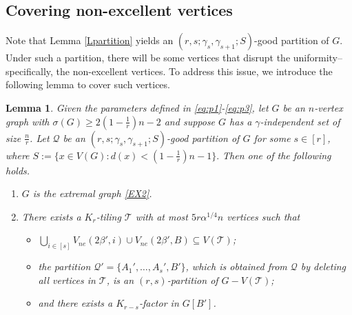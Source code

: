 \documentclass[11pt, a4paper]{article}
\newtheorem{lemma}[theorem]{Lemma}
\theoremstyle{definition}
\newcommand{\<}{\subseteq}
\begin{document}
\subsection{Covering non-excellent vertices}\label{section5.2}

Note that Lemma \ref{Lpartition} yields an $(r,s;\gamma_s,\gamma_{s+1};S)$-good partition of $G$. Under such a partition, there will be some vertices that disrupt the uniformity--specifically, the non-excellent vertices. To address this issue, we introduce the following lemma to cover such vertices. 

\begin{lemma}\label{K_r-tiling}
      Given the parameters defined in \eqref{eq:p1}-\eqref{eq:p3}, let $G$ be an $n$-vertex graph with
$\sigma(G)\ge 2\left(1-\frac{1}{r}\right)n-2$ 
and suppose $G$ has a $\gamma$-independent set of size $\frac{n}{r}$. Let $\mathcal{Q}$ be an $(r,s;\gamma_s,\gamma_{s+1};S)$-good partition of $G$ for some $s\in[r]$, where $S:=\{x\in V(G):d(x)<(1-\frac{1}{r})n-1\}.$ %
Then one of the following holds. %
    \begin{enumerate}
    [label =\rm  (B\arabic{enumi})]
        \item\label{L1} $G$ is the extremal graph  \ref{EX2}.
        \item\label{L2} There exists a $K_r$-tiling $\mathcal{T}$ with at most $5r\alpha^{1/4}n$ vertices such that 
        \begin{itemize}
        \item $\bigcup_{i\in [s]}V_{ne}(2\beta',i)\cup V_{ne}(2\beta',B)\subseteq V(\mathcal{T})$;
        \item the partition $\mathcal{Q'}=        \{A_1',\ldots, A_s',B'\}$, which is obtained  from $\mathcal{Q}$ by deleting all vertices in $\mathcal{T}$, is an $(r,s)$-partition of $G-V(\mathcal{T})$;
        \item and there exists a $K_{r-s}$-factor in $G[B']$.
        \end{itemize} 
        \end{enumerate} 
\end{lemma}
\end{document}
